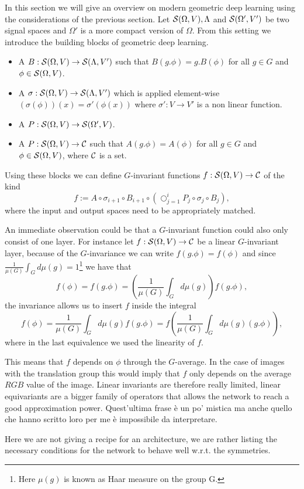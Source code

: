 \documentclass[../3.tex]{subfiles}
\begin{document}
    { \color{blue}
    In this section we will give an overview on modern geometric deep learning using the considerations of the previous section.
    Let $\mathcal{S}(\Omega,V),\Lambda$ and $\mathcal{S}(\Omega',V')$ be two signal spaces and $\Omega'$ is a more compact version of $\Omega$.
    From this setting we introduce the building blocks of geometric deep learning.

    \begin{itemize}
        \item A  $B : \mathcal{S}(\Omega,V) \to \mathcal{S}(\Lambda,V')$ such that
            $B(g.\phi) = g.B(\phi)$ for all $g \in G$ and $\phi \in \mathcal{S}(\Omega,V)$.
        \item A  $\sigma : \mathcal{S}(\Omega,V) \to \mathcal{S}(\Lambda,V')$ which is applied element-wise 
            $(\sigma(\phi))(x) = \sigma'(\phi(x))$ where $\sigma' : V \to V'$ is a non linear function.
        \item A  $P : \mathcal{S}(\Omega,V) \to \mathcal{S}(\Omega',V)$.
        \item A  $P : \mathcal{S}(\Omega,V) \to \mathcal{C}$ such that $A(g.\phi) = A(\phi)$ for all $g \in G$ 
        and $\phi \in \mathcal{S}(\Omega,V)$, where $\mathcal{C}$ is a set.
    \end{itemize}

    Using these blocks we can define $G$-invariant functions $f : \mathcal{S}(\Omega,V) \to \mathcal{C}$ of the kind
    \[ f := A \circ \sigma_{i+1} \circ B_{i+1} \circ (\bigcirc_{j = 1}^i P_j \circ \sigma_j \circ B_j ) , \]
    where the input and output spaces need to be appropriately matched.

    An immediate observation could be that a $G$-invariant function could also only consist of one layer.
    For instance let $f : \mathcal{S}(\Omega,V) \to \mathcal{C}$ be a linear $G$-invariant layer, because of the $G$-invariance we can write
    $f(g.\phi) = f(\phi)$ and since $\frac{1}{\mu(G)} \int_G d\mu(g) = 1$\footnote{Here $\mu(g)$ is known as Haar measure on the group G.} we have that
    \[ f(\phi) = f(g.\phi) = (\frac{1}{\mu(G)} \int_G d\mu(g)) f(g.\phi),  \]
    the invariance allows us to insert $f$ inside the integral
    \[ f(\phi) = \frac{1}{\mu(G)} \int_G d\mu(g) f(g.\phi) = f(\frac{1}{\mu(G)} \int_G d\mu(g) (g.\phi)), \]
    where in the last equivalence we used the linearity of $f$.

    This means that $f$ depends on $\phi$ through the $G$-average.
    In the case of images with the translation group this would imply that $f$ only depends on the average $RGB$ value of the image.
    Linear invariants are therefore really limited, linear equivariants are a bigger family of operators that allows the network to reach a good approximation
    power.{\color{red} Quest'ultima frase è un po' mistica ma anche quello che hanno scritto loro per me è impossibile da interpretare.}
    
    Here we are not giving a recipe for an architecture, we are rather listing the necessary conditions for the network to behave well w.r.t. the symmetries.
    }   
\end{document}
